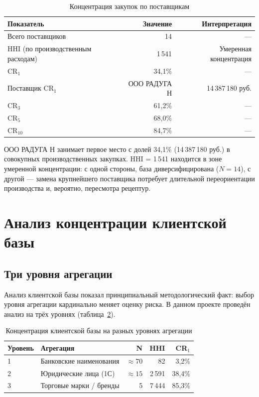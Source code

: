 \begin{table}[H]
\centering
\caption{Концентрация закупок по поставщикам}
\label{tab:supplier_concentration}
\begin{tabular}{lrr}
\toprule
\textbf{Показатель} & \textbf{Значение} & \textbf{Интерпретация} \\
\midrule
Всего поставщиков & 14 & --- \\
HHI (по производственным расходам) & 1\,541 & Умеренная концентрация \\
CR$_1$ & 34,1\% & --- \\
Поставщик CR$_1$ & ООО РАДУГА Н & 14\,387\,180 руб. \\
CR$_3$ & 61,2\% & --- \\
CR$_5$ & 68,0\% & --- \\
CR$_{10}$ & 84,7\% & --- \\
\bottomrule
\end{tabular}
\end{table}

ООО РАДУГА Н занимает первое место с долей 34,1\% (14\,387\,180 руб.) в совокупных производственных закупках. HHI = 1\,541 находится в зоне умеренной концентрации: с одной стороны, база диверсифицирована ($N=14$), с другой --- замена крупнейшего поставщика потребует длительной переориентации производства и, вероятно, пересмотра рецептур.

\section{Анализ концентрации клиентской базы}

\subsection{Три уровня агрегации}

Анализ клиентской базы показал принципиальный методологический факт: выбор уровня агрегации кардинально меняет оценку риска. В данном проекте проведён анализ на трёх уровнях (таблица~\ref{tab:client_concentration}).

\begin{table}[H]
\centering
\caption{Концентрация клиентской базы на разных уровнях агрегации}
\label{tab:client_concentration}
\begin{tabular}{llrrr}
\toprule
\textbf{Уровень} & \textbf{Агрегация} & \textbf{N} & \textbf{HHI} & \textbf{CR}$_1$ \\
\midrule
1 & Банковские наименования & $\approx 70$ & 82 & 3,2\% \\
2 & Юридические лица (1С) & $\approx 15$ & 2\,591 & 38,4\% \\
3 & Торговые марки / бренды & 5 & 7\,444 & 85,3\% \\
\bottomrule
\end{tabular}
\end{table}

